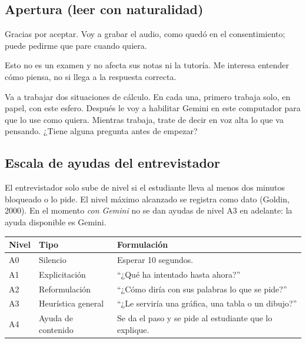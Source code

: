\documentclass[11pt,letterpaper]{article}
\newcounter{preg}
\begin{document}
\subsection{Apertura (leer con naturalidad)}
\begin{guion}
Gracias por aceptar. Voy a grabar el audio, como quedó en el consentimiento; puede pedirme que pare cuando quiera.

Esto no es un examen y no afecta sus notas ni la tutoría. Me interesa entender cómo piensa, no si llega a la respuesta correcta.

Va a trabajar dos situaciones de cálculo. En cada una, primero trabaja solo, en papel, con este esfero. Después le voy a habilitar Gemini en este computador para que lo use como quiera. Mientras trabaja, trate de decir en voz alta lo que va pensando. ¿Tiene alguna pregunta antes de empezar?
\end{guion}

\subsection{Escala de ayudas del entrevistador}\label{sec:ayudas}
El entrevistador solo sube de nivel si el estudiante lleva al menos dos minutos bloqueado o lo pide. El nivel máximo alcanzado se registra como dato (Goldin, 2000). En el momento \emph{con Gemini} no se dan ayudas de nivel A3 en adelante: la ayuda disponible es Gemini.

\begin{center}
\small
\renewcommand{\arraystretch}{1.25}
\begin{tabularx}{\linewidth}{@{}p{1.1cm}p{3.4cm}L@{}}
\toprule
\textbf{Nivel} & \textbf{Tipo} & \textbf{Formulación}\\
\midrule
A0 & Silencio & Esperar 10 segundos.\\
A1 & Explicitación & ``¿Qué ha intentado hasta ahora?''\\
A2 & Reformulación & ``¿Cómo diría con sus palabras lo que se pide?''\\
A3 & Heurística general & ``¿Le serviría una gráfica, una tabla o un dibujo?''\\
A4 & Ayuda de contenido & Se da el paso y se pide al estudiante que lo explique.\\
\bottomrule
\end{tabularx}
\end{center}
\end{document}
